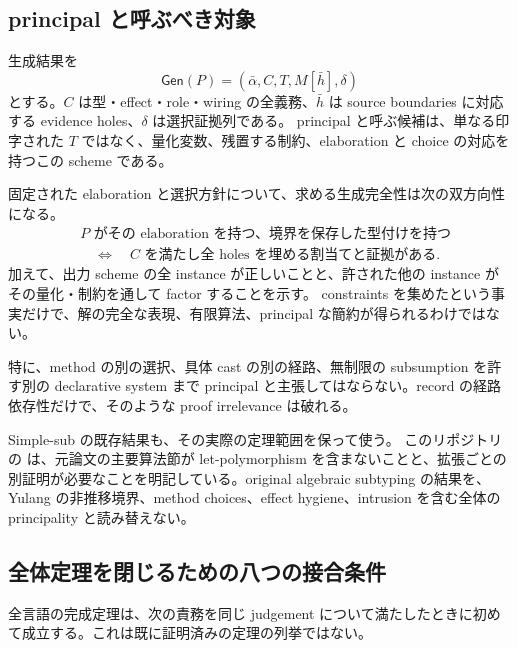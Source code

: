 \documentclass[11pt,a4paper]{article}
\theoremstyle{remark}
\newcommand{\newsrc}[2]{\href{https://github.com/momota1029/yulang/blob/d5552b3e328e53c3a60170329cd2192e4e11c097/#1}{\texttt{\detokenize{#2}}}}
\begin{document}
\subsection{principal と呼ぶべき対象}

生成結果を
\[
\mathsf{Gen}(P)=(\bar\alpha,C,T,M[\bar h],\delta)
\]
とする。$C$ は型・effect・role・wiring の全義務、$\bar h$ は source boundaries に対応する evidence holes、$\delta$ は選択証拠列である。
principal と呼ぶ候補は、単なる印字された $T$ ではなく、量化変数、残置する制約、elaboration と choice の対応を持つこの scheme である。

固定された elaboration と選択方針について、求める生成完全性は次の双方向性になる。
\[
\begin{aligned}
&\text{$P$ がその elaboration を持つ、境界を保存した型付けを持つ}\\
&\quad\Longleftrightarrow\quad
\text{$C$ を満たし全 holes を埋める割当てと証拠がある}.
\end{aligned}
\]
加えて、出力 scheme の全 instance が正しいことと、許された他の instance がその量化・制約を通して factor することを示す。
constraints を集めたという事実だけで、解の完全な表現、有限算法、principal な簡約が得られるわけではない。

特に、method の別の選択、具体 cast の別の経路、無制限の subsumption を許す別の declarative system まで principal と主張してはならない。record の経路依存性だけで、そのような proof irrelevance は破れる。

Simple-sub の既存結果も、その実際の定理範囲を保って使う。
このリポジトリの
\newsrc{notes/theory/2026-10-11-parreaux-simple-sub-proof-import.md}{Simple-sub proof import}
は、元論文の主要算法節が let-polymorphism を含まないことと、拡張ごとの別証明が必要なことを明記している。original algebraic subtyping の結果を、Yulang の非推移境界、method choices、effect hygiene、intrusion を含む全体の principality と読み替えない。

\subsection{全体定理を閉じるための八つの接合条件}

全言語の完成定理は、次の責務を同じ judgement について満たしたときに初めて成立する。これは既に証明済みの定理の列挙ではない。
\end{document}
